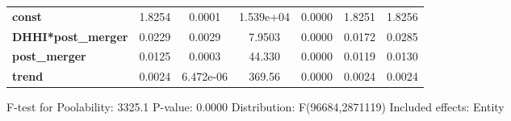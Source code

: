\documentclass{report}
\begin{document}
\begin{center}
\begin{tabular}{lcccccc}
\midrule
\textbf{const}             &       1.8254       &       0.0001       &    1.539e+04    &      0.0000      &       1.8251      &       1.8256       \\
\textbf{DHHI*post\_merger} &       0.0229       &       0.0029       &      7.9503     &      0.0000      &       0.0172      &       0.0285       \\
\textbf{post\_merger}      &       0.0125       &       0.0003       &      44.330     &      0.0000      &       0.0119      &       0.0130       \\
\textbf{trend}             &       0.0024       &     6.472e-06      &      369.56     &      0.0000      &       0.0024      &       0.0024       \\
\bottomrule
\end{tabular}
\end{center}

F-test for Poolability: 3325.1 \newline
 P-value: 0.0000 \newline
 Distribution: F(96684,2871119) \newline
  \newline
 Included effects: Entity
\end{document}

